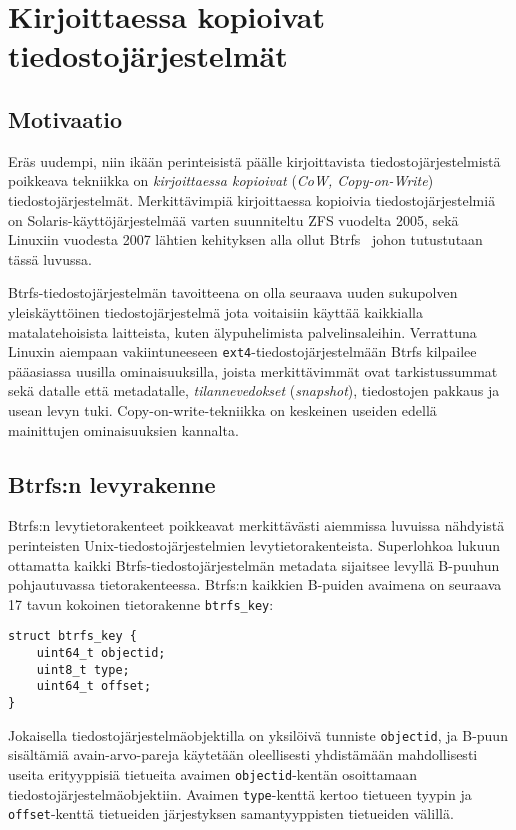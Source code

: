\section{Kirjoittaessa kopioivat tiedostojärjestelmät}
\label{ChapCopyOnWrite}
\subsection{Motivaatio}
Eräs uudempi,
niin ikään perinteisistä päälle kirjoittavista tiedostojärjestelmistä poikkeava tekniikka on \emph{kirjoittaessa kopioivat} (\emph{CoW, Copy-on-Write}) tiedostojärjestelmät.
Merkittävimpiä kirjoittaessa kopioivia tiedostojärjestelmiä on Solaris-käyttöjärjestelmää varten suunniteltu ZFS vuodelta 2005,
sekä Linuxiin vuodesta 2007 lähtien kehityksen alla ollut Btrfs~\cite{Btrfs} johon tutustutaan tässä luvussa.

Btrfs-tiedostojärjestelmän tavoitteena on olla seuraava uuden sukupolven yleiskäyttöinen tiedostojärjestelmä jota voitaisiin käyttää kaikkialla matalatehoisista laitteista, kuten älypuhelimista palvelinsaleihin.
Verrattuna Linuxin aiempaan vakiintuneeseen \texttt{ext4}-tiedostojärjestelmään Btrfs kilpailee pääasiassa uusilla ominaisuuksilla,
joista merkittävimmät ovat tarkistussummat sekä datalle että metadatalle, \emph{tilannevedokset} (\emph{snapshot}), tiedostojen pakkaus ja usean levyn tuki.
Copy-on-write-tekniikka on keskeinen useiden edellä mainittujen ominaisuuksien kannalta.

\subsection{Btrfs:n levyrakenne}
Btrfs:n levytietorakenteet poikkeavat merkittävästi aiemmissa luvuissa nähdyistä perinteisten Unix-tiedosto\-järjestelmien levytietorakenteista.
Superlohkoa lukuun ottamatta kaikki Btrfs-tiedostojärjestelmän metadata sijaitsee levyllä B-puuhun pohjautuvassa tietorakenteessa.
Btrfs:n kaikkien B-puiden avaimena on seuraava 17 tavun kokoinen tietorakenne \texttt{btrfs\_key}:
\begin{verbatim}
struct btrfs_key {
    uint64_t objectid;
    uint8_t type;
    uint64_t offset;
}
\end{verbatim}
Jokaisella tiedostojärjestelmäobjektilla on yksilöivä tunniste \texttt{objectid},
ja B-puun sisältämiä avain-arvo-pareja käytetään oleellisesti yhdistämään mahdollisesti useita erityyppisiä tietueita avaimen \texttt{objectid}-kentän osoittamaan tiedostojärjestelmäobjektiin.
Avaimen \texttt{type}-kenttä kertoo tietueen tyypin ja \texttt{offset}-kenttä tietueiden järjestyksen samantyyppisten tietueiden välillä.


